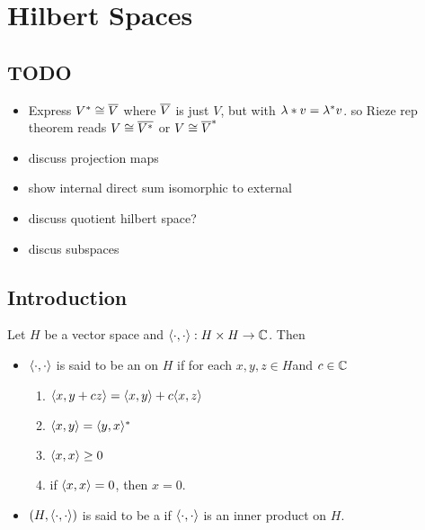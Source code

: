 \documentclass{book}
\begin{document}
	
	
	
	
	
	
	\newpage
	\chapter{Hilbert Spaces}
	
	\section{TODO}
	\begin{itemize}
		\item Express $V^* \cong \overline{V}$ where $\overline{V}$ is just $V$, but with $\lambda * v  = \lambda^* v$. so Rieze rep theorem reads $V \cong \overline{V^*}$ or $V \cong \overline{V}^*$
		\item discuss projection maps
		\item show internal direct sum isomorphic to external
		\item discuss quotient hilbert space?
		\item discus subspaces
	\end{itemize}
	
	
	
	
	
	
	
	
	
	
	
	
	
	
	
	\section{Introduction}
	
	\begin{defn} \ld{}
		Let $H$ be a vector space and $\langle \cdot, \cdot \rangle: H \times H \rightarrow \mathbb{C}$. Then 
		\begin{itemize}
			\item $\langle \cdot, \cdot \rangle$ is said to be an  on $H$ if for each $x,y,z \in H$and $c \in \mathbb{C}$
			\begin{enumerate}
				\item $\langle x , y + cz\rangle = \langle x , y \rangle + c\langle x , z\rangle $
				\item $\langle x , y \rangle = \langle y , x\rangle^*$
				\item $\langle x , x \rangle \geq 0$
				\item if $\langle x ,x \rangle = 0$, then $x = 0$.  
			\end{enumerate}
			\item $(H, \langle \cdot, \cdot \rangle)$ is said to be a  if $\langle \cdot, \cdot \rangle$ is an inner product on $H$.
		\end{itemize}
	\end{defn}
\end{document}
